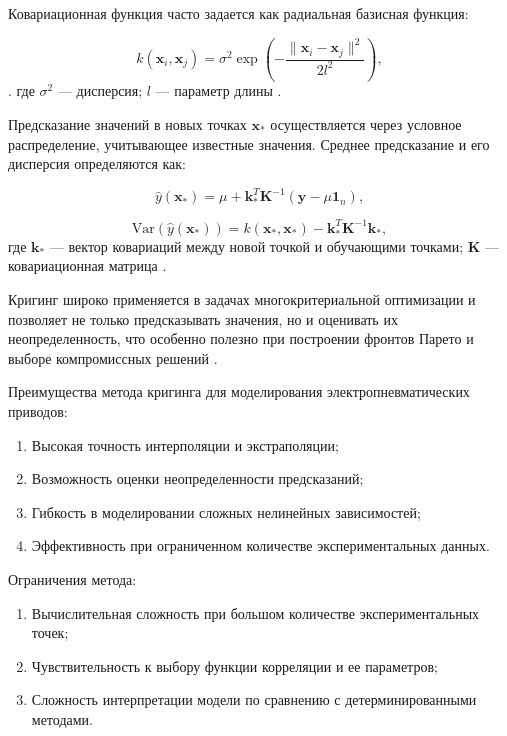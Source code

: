 Ковариационная функция часто задается как радиальная базисная функция:

\begin{equation*}
    k(\mathbf{x}_i, \mathbf{x}_j) = \sigma^2 \exp\left(-\frac{\|\mathbf{x}_i - \mathbf{x}_j\|^2}{2l^2}\right),
\end{equation*}.
где \( \sigma^2 \) — дисперсия;
$l$ — параметр длины \cite{figueroa2021gaussian}.

Предсказание значений в новых точках $\mathbf{x}_*$ осуществляется через условное распределение, учитывающее известные значения.
Среднее предсказание и его дисперсия определяются как:

\begin{equation*}
    \hat{y}(\mathbf{x}_*) = \mu + \mathbf{k}_*^T \mathbf{K}^{-1} (\mathbf{y} - \mu \mathbf{1}_n),
\end{equation*}

\begin{equation*}
    \text{Var}(\hat{y}(\mathbf{x}_*)) = k(\mathbf{x}_*, \mathbf{x}_*) - \mathbf{k}_*^T \mathbf{K}^{-1} \mathbf{k}_*,
\end{equation*}
где $\mathbf{k}_*$ — вектор ковариаций между новой точкой и обучающими точками;
$\mathbf{K}$ — ковариационная матрица \cite{zhou2020enhanced}.

Кригинг широко применяется в задачах многокритериальной оптимизации и позволяет
не только предсказывать значения, но и оценивать их неопределенность, что особенно
полезно при построении фронтов Парето и выборе компромиссных решений \cite{radaideh2020surrogate}.

Преимущества метода кригинга для моделирования электропневматических приводов:

\begin{enumerate}
    \item Высокая точность интерполяции и экстраполяции;
    \item Возможность оценки неопределенности предсказаний;
    \item Гибкость в моделировании сложных нелинейных зависимостей;
    \item Эффективность при ограниченном количестве экспериментальных данных.
\end{enumerate}

Ограничения метода:

\begin{enumerate}
    \item Вычислительная сложность при большом количестве экспериментальных точек;
    \item Чувствительность к выбору функции корреляции и ее параметров;
    \item Сложность интерпретации модели по сравнению с детерминированными методами.
\end{enumerate}

